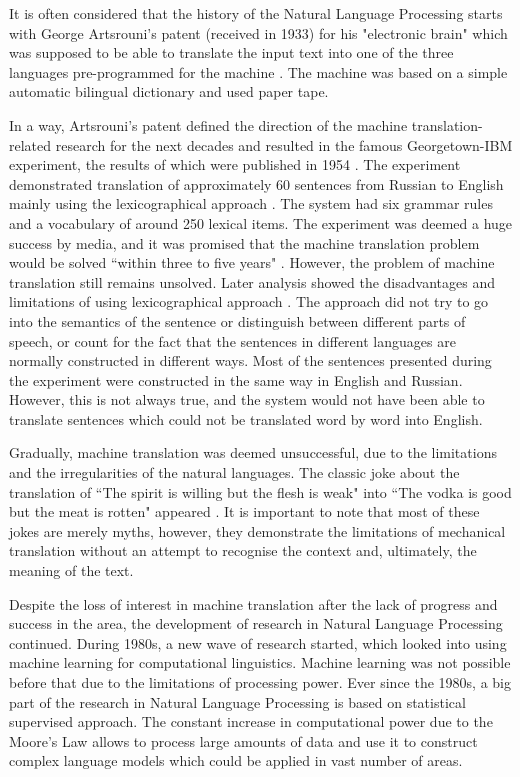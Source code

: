 It is often considered that the history of the Natural Language Processing starts with George Artsrouni's patent (received in 1933) for his "electronic brain" which was supposed to be able to translate the input text into one of the three languages pre-programmed for the machine \cite{hutchins2004two}. The machine was based on a simple automatic bilingual dictionary and used paper tape. 

In a way, Artsrouni's patent defined the direction of the machine translation-related research for the next decades and resulted in the famous Georgetown-IBM experiment, the results of which were published in 1954 \cite{dostert1955georgetown}. The experiment demonstrated translation of approximately 60 sentences from Russian to English mainly using the lexicographical approach \cite{hutchins2004georgetown}. The system had six grammar rules and a vocabulary of around 250 lexical items. The experiment was deemed a huge success by media, and it was promised that the machine translation problem would be solved ``within three to five years" \cite{plumb1954russian}. However, the problem of machine translation still remains unsolved. Later analysis showed the disadvantages and limitations of using lexicographical approach \cite{garvin1968georgetown}. The approach did not try to go into the semantics of the sentence or distinguish between different parts of speech, or count for the fact that the sentences in different languages are normally constructed in different ways. Most of the sentences presented during the experiment were constructed in the same way in English and Russian. However, this is not always true, and the system would not have been able to translate sentences which could not be translated word by word into English. 

Gradually, machine translation was deemed unsuccessful, due to the limitations and the irregularities of the natural languages. The classic joke about the translation of ``The spirit is willing but the flesh is weak" into ``The vodka is good but the meat is rotten" appeared \cite{hutchins1995whisky}. It is important to note that most of these jokes are merely myths, however, they demonstrate the limitations of mechanical translation without an attempt to recognise the context and, ultimately, the meaning of the text.

Despite the loss of interest in machine translation after the lack of progress and success in the area, the development of research in Natural Language Processing continued. During 1980s, a new wave of research started, which looked into using machine learning for computational linguistics. Machine learning was not possible before that due to the limitations of processing power. Ever since the 1980s, a big part of the research in Natural Language Processing is based on statistical supervised approach. The constant increase in computational power due to the Moore's Law allows to process large amounts of data and use it to construct complex language models which could be applied in vast number of areas.

